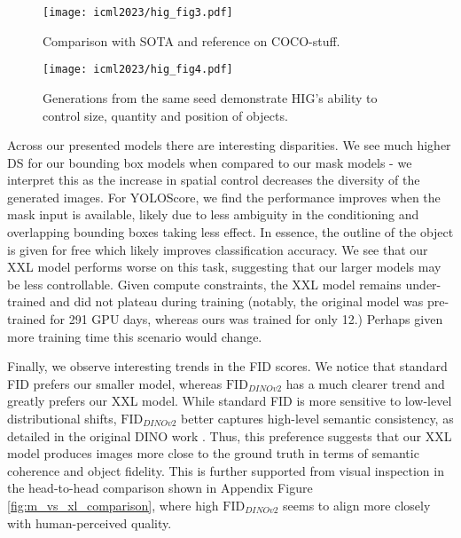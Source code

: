 \begin{figure}
    \centering
    \texttt{[image: icml2023/hig\_fig3.pdf]}
    \vspace{-20pt}
    \caption{Comparison with SOTA and reference on COCO-stuff.}
    \label{fig:3}    
\end{figure}

\begin{figure}[t]
    \centering
    \texttt{[image: icml2023/hig\_fig4.pdf]}
    \vspace{-20pt}
    \caption{Generations from the same seed demonstrate HIG's ability to control size, quantity and position of objects.}
    \label{fig:size_editing}    
\end{figure}

Across our presented models there are interesting disparities. We see much higher DS for our bounding box models when compared to our mask models - we interpret this as the increase in spatial control decreases the diversity of the generated images. For YOLOScore, we find the performance improves when the mask input is available, likely due to less ambiguity in the conditioning and overlapping bounding boxes taking less effect. In essence, the outline of the object is given for free which likely improves classification accuracy. We see that our XXL model performs worse on this task, suggesting that our larger models may
be less controllable. Given compute constraints, the XXL model remains under-trained and did not plateau during training (notably, the original model was pre-trained for 291 GPU days, whereas ours was trained for only 12.) Perhaps given more training time this scenario would change.

Finally, we observe interesting trends in the FID scores. We notice that standard FID prefers our smaller model, whereas $\text{FID}_{\textit{DINOv2}}$ has a much clearer trend and greatly prefers our XXL model. While standard FID is more sensitive to low-level distributional shifts, $\text{FID}_{\textit{DINOv2}}$ better captures high-level semantic consistency, as detailed in the original DINO work \cite{szegedy2015rethinkinginceptionarchitecturecomputer}. Thus, this preference suggests that our XXL model produces images more close to the ground truth in terms of semantic coherence and object fidelity. This is further supported from visual inspection in the head-to-head comparison shown in Appendix Figure \ref{fig:m_vs_xl_comparison}, where high $\text{FID}_{\textit{DINOv2}}$ seems to align more closely with human-perceived quality.

